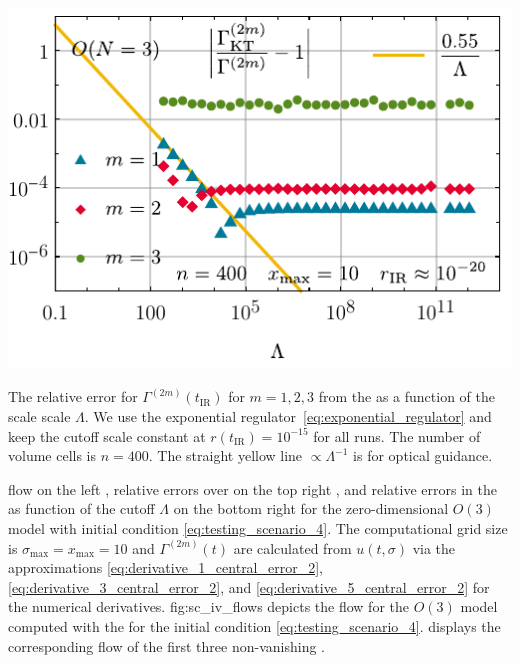 	{%
		\includegraphics[width=\subcaptionFigureWidth]{0d/figures/sc_iv_on_3_n_400_xmax_10_rir_10e-20_cutoff_test.pdf}
		\caption{
			The relative error for $\Gamma^{(2m)}(t_\mathrm{IR})$ for $m = 1, 2, 3$ from the \ktScheme{} as a function of the \uv{} scale scale $\Lambda$.
			We use the exponential regulator~\eqref{eq:exponential_regulator} and keep the \ir{} cutoff scale constant at $r(t_\mathrm{IR}) = 10^{-15}$ for all runs.
			The number of volume cells is $n = 400$.
			The straight yellow line $\propto \Lambda^{-1}$ is for optical guidance.
		}%
		\label{fig:sc_iv_on_3_n_400_xmax_10_rir_10e-20_cutoff_test}%
	}%
	{%
		\Frg{} flow on the left , relative errors over \rgtime{} on the top right , and relative errors in the \ir{} as function of the \uv{} cutoff $\Lambda$ on the bottom right  for the zero-dimensional $O ( 3 )$ model with initial condition \cref{eq:testing_scenario_4}.
		The computational grid size is $\sigma_\mathrm{max} = x_\mathrm{max} = 10$ and $\Gamma^{(2m)}(t)$ are calculated from $u ( t, \sigma )$ via the approximations \eqref{eq:derivative_1_central_error_2}, \eqref{eq:derivative_3_central_error_2}, and \eqref{eq:derivative_5_central_error_2} for the numerical derivatives.
	}%
	{fig:sc_iv_flows}%
 depicts the \frg{} flow for the $O(3)$ model computed with the \ktScheme{} for the \uv{} initial condition \eqref{eq:testing_scenario_4}.
 displays the corresponding flow of the first three non-vanishing \nptFunctions{}.
